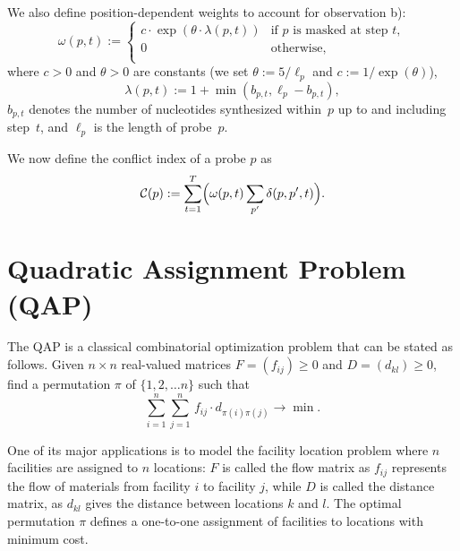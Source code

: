 \documentclass[portrait]{a0poster}
\begin{document}
\begin{multicols}{3}[\aggiheader]
\noindent We also define position-dependent weights to account for observation
b):
\begin{equation}\label{eq:pos_mult}
\omega(p,t) :=
\left\{
        \begin{array}{ll}
                c \cdot \exp{\left(\theta \cdot \lambda(p,t)\right)} & \mbox{if $p$ is masked at step $t$}, \\
                0 & \mbox{otherwise}, \\
        \end{array}
\right.
\end{equation}
where $c>0$ and $\theta>0$ are constants (we set $\theta := 5/\ell_p$ and
$c := 1/\exp(\theta)$),
\begin{equation}\label{eq:base_pos}
  \lambda(p,t) := 1 + \min(b_{p,t},\ell_{p} - b_{p,t}),
\end{equation}
$b_{p,t}$ denotes the number of nucleotides synthesized within~$p$ up to and
including step~$t$, and $\ell_{p}$ is the length of probe~$p$.

\noindent We now define the conflict index of a probe $p$ as
\begin{equation}
\label{eq:conf_idx}
\mathcal{C}(p) := \sum_{t=1}^{T} \Bigl( \omega(p,t) \sum_{p'} \delta(p,p',t) \Bigr).
\end{equation}


\section*{\textcolor{aggigreen}{Quadratic Assignment Problem (QAP)}}

\noindent The QAP is a classical combinatorial optimization problem that can be
stated as follows. Given $n \times n$ real-valued matrices $F = (f_{ij})\geq 0$ and $D = (d_{kl})\geq 0$, find a permutation $\pi$ of $\{1, 2, \ldots n\}$ such that
\begin{equation}\label{eq:qap_def}
  \sum_{i=1}^{n} \sum_{j=1}^{n}\,  f_{ij} \cdot d_{\pi(i)\pi(j)} \to \min.
\end{equation}

\noindent One of its major applications is to model the facility location
problem where $n$ facilities are assigned to $n$ locations: $F$ is called
the flow matrix as $f_{ij}$ represents the flow of materials from facility $i$
to facility $j$, while $D$ is called the distance matrix, as $d_{kl}$ gives the
distance between locations $k$ and $l$. The optimal permutation $\pi$ defines a
one-to-one assignment of facilities to locations with minimum cost.


\end{multicols}
\end{document}
